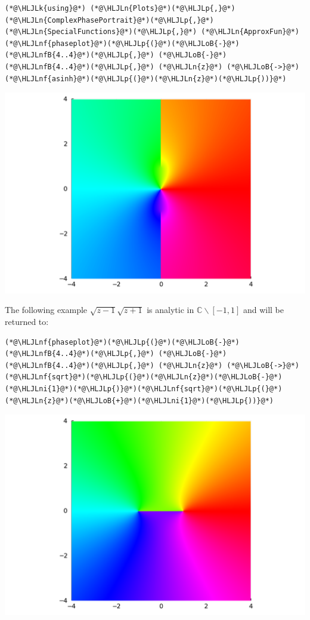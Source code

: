 \documentclass[12pt,a4paper]{article}
\newcommand{\HLJLk}[1]{\textcolor[RGB]{148,91,176}{\textbf{#1}}}
\newcommand{\HLJLn}[1]{#1}
\newcommand{\HLJLnf}[1]{\textcolor[RGB]{66,102,213}{#1}}
\newcommand{\HLJLnfB}[1]{\textcolor[RGB]{59,151,46}{#1}}
\newcommand{\HLJLni}[1]{\textcolor[RGB]{59,151,46}{#1}}
\newcommand{\HLJLoB}[1]{\textcolor[RGB]{102,102,102}{\textbf{#1}}}
\newcommand{\HLJLp}[1]{#1}
\begin{document}
\begin{lstlisting}
(*@\HLJLk{using}@*) (*@\HLJLn{Plots}@*)(*@\HLJLp{,}@*) (*@\HLJLn{ComplexPhasePortrait}@*)(*@\HLJLp{,}@*) (*@\HLJLn{SpecialFunctions}@*)(*@\HLJLp{,}@*) (*@\HLJLn{ApproxFun}@*)
(*@\HLJLnf{phaseplot}@*)(*@\HLJLp{(}@*)(*@\HLJLoB{-}@*)(*@\HLJLnfB{4..4}@*)(*@\HLJLp{,}@*) (*@\HLJLoB{-}@*)(*@\HLJLnfB{4..4}@*)(*@\HLJLp{,}@*) (*@\HLJLn{z}@*) (*@\HLJLoB{->}@*) (*@\HLJLnf{asinh}@*)(*@\HLJLp{(}@*)(*@\HLJLn{z}@*)(*@\HLJLp{))}@*)
\end{lstlisting}

\includegraphics[width=\linewidth]{jl_z7eR69/Lecture1_18_1.pdf}

The following example $\sqrt{z-1} \sqrt{z+1}$ is analytic in ${\mathbb C}\backslash [-1,1]$ and will be returned to:


\begin{lstlisting}
(*@\HLJLnf{phaseplot}@*)(*@\HLJLp{(}@*)(*@\HLJLoB{-}@*)(*@\HLJLnfB{4..4}@*)(*@\HLJLp{,}@*) (*@\HLJLoB{-}@*)(*@\HLJLnfB{4..4}@*)(*@\HLJLp{,}@*) (*@\HLJLn{z}@*) (*@\HLJLoB{->}@*) (*@\HLJLnf{sqrt}@*)(*@\HLJLp{(}@*)(*@\HLJLn{z}@*)(*@\HLJLoB{-}@*)(*@\HLJLni{1}@*)(*@\HLJLp{)}@*)(*@\HLJLnf{sqrt}@*)(*@\HLJLp{(}@*)(*@\HLJLn{z}@*)(*@\HLJLoB{+}@*)(*@\HLJLni{1}@*)(*@\HLJLp{))}@*)
\end{lstlisting}

\includegraphics[width=\linewidth]{jl_z7eR69/Lecture1_19_1.pdf}
\end{document}
